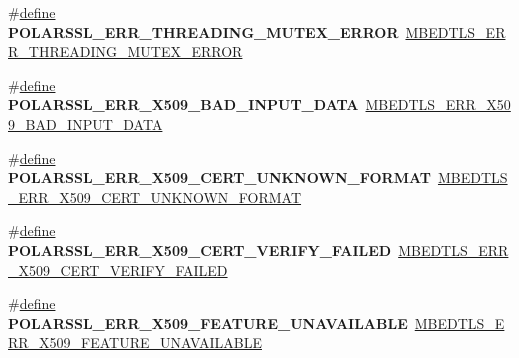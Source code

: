 \begin{DoxyCompactItemize}
\item 
\mbox{\label{compat-1_83_8h_afea02eb560c790911a89035bbcc909ad}} 
\#\hyperlink{structdefine}{define} {\bfseries P\+O\+L\+A\+R\+S\+S\+L\+\_\+\+E\+R\+R\+\_\+\+T\+H\+R\+E\+A\+D\+I\+N\+G\+\_\+\+M\+U\+T\+E\+X\+\_\+\+E\+R\+R\+OR}~\hyperlink{threading_8h_a51005c51b928706511d3c2ea3390c07f}{M\+B\+E\+D\+T\+L\+S\+\_\+\+E\+R\+R\+\_\+\+T\+H\+R\+E\+A\+D\+I\+N\+G\+\_\+\+M\+U\+T\+E\+X\+\_\+\+E\+R\+R\+OR}
\item 
\mbox{\label{compat-1_83_8h_a59ea8fbabf8eae3f006824230bc27d6c}} 
\#\hyperlink{structdefine}{define} {\bfseries P\+O\+L\+A\+R\+S\+S\+L\+\_\+\+E\+R\+R\+\_\+\+X509\+\_\+\+B\+A\+D\+\_\+\+I\+N\+P\+U\+T\+\_\+\+D\+A\+TA}~\hyperlink{group__x509__module_gaeeef11ebf0b31a54a665b1a3fd65c3f7}{M\+B\+E\+D\+T\+L\+S\+\_\+\+E\+R\+R\+\_\+\+X509\+\_\+\+B\+A\+D\+\_\+\+I\+N\+P\+U\+T\+\_\+\+D\+A\+TA}
\item 
\mbox{\label{compat-1_83_8h_a2a86f0efb25d083307eadf96585d4222}} 
\#\hyperlink{structdefine}{define} {\bfseries P\+O\+L\+A\+R\+S\+S\+L\+\_\+\+E\+R\+R\+\_\+\+X509\+\_\+\+C\+E\+R\+T\+\_\+\+U\+N\+K\+N\+O\+W\+N\+\_\+\+F\+O\+R\+M\+AT}~\hyperlink{group__x509__module_gaeb90af9ad906c5075b1ad625ebc26553}{M\+B\+E\+D\+T\+L\+S\+\_\+\+E\+R\+R\+\_\+\+X509\+\_\+\+C\+E\+R\+T\+\_\+\+U\+N\+K\+N\+O\+W\+N\+\_\+\+F\+O\+R\+M\+AT}
\item 
\mbox{\label{compat-1_83_8h_a2712a2708993f706e6c3f3716ec1f275}} 
\#\hyperlink{structdefine}{define} {\bfseries P\+O\+L\+A\+R\+S\+S\+L\+\_\+\+E\+R\+R\+\_\+\+X509\+\_\+\+C\+E\+R\+T\+\_\+\+V\+E\+R\+I\+F\+Y\+\_\+\+F\+A\+I\+L\+ED}~\hyperlink{group__x509__module_gaba46df0041dcf48fa9d164d28cf3a154}{M\+B\+E\+D\+T\+L\+S\+\_\+\+E\+R\+R\+\_\+\+X509\+\_\+\+C\+E\+R\+T\+\_\+\+V\+E\+R\+I\+F\+Y\+\_\+\+F\+A\+I\+L\+ED}
\item 
\mbox{\label{compat-1_83_8h_aa1ff85472d1f06bac7aadef70dbc404f}} 
\#\hyperlink{structdefine}{define} {\bfseries P\+O\+L\+A\+R\+S\+S\+L\+\_\+\+E\+R\+R\+\_\+\+X509\+\_\+\+F\+E\+A\+T\+U\+R\+E\+\_\+\+U\+N\+A\+V\+A\+I\+L\+A\+B\+LE}~\hyperlink{group__x509__module_ga185bc7f27a2b1f7742537a2377c52ee3}{M\+B\+E\+D\+T\+L\+S\+\_\+\+E\+R\+R\+\_\+\+X509\+\_\+\+F\+E\+A\+T\+U\+R\+E\+\_\+\+U\+N\+A\+V\+A\+I\+L\+A\+B\+LE}
\item 
\mbox{\label{compat-1_83_8h_a87e65fdadeba914a5555ef09ab35c48b}} 

\end{DoxyCompactItemize}
